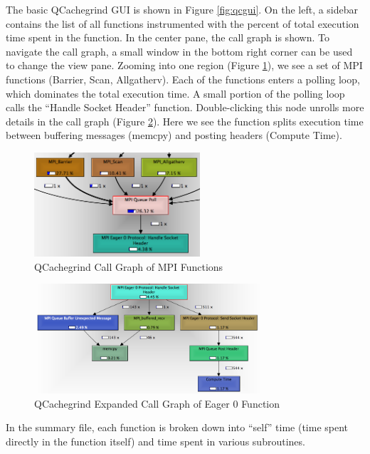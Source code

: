 The basic QCachegrind GUI is shown in Figure \ref{fig:qcgui}.  
On the left, a sidebar contains the list of all functions instrumented with the percent of total execution time spent in the function.
In the center pane, the call graph is shown.  
To navigate the call graph, a small window in the bottom right corner can be used to change the view pane.
Zooming into one region (Figure \ref{fig:qcgraphone}), we see a set of MPI functions (Barrier, Scan, Allgatherv).
Each of the functions enters a polling loop, which dominates the total execution time.  
A small portion of the polling loop calls the ``Handle Socket Header'' function.
Double-clicking this node unrolls more details in the call graph (Figure \ref{fig:qcgraphtwo}).
Here we see the function splits execution time between buffering messages (memcpy) and posting headers (Compute Time).

\begin{figure}[h!]
\centering
\includegraphics[width=0.55\textwidth]{figures/graphviz/callgraph1.png}
\caption{QCachegrind Call Graph of MPI Functions}
\label{fig:qcgraphone}
\end{figure}

\begin{figure}[h!]
\centering
\includegraphics[width=0.75\textwidth]{figures/graphviz/callgraph2.png}
\caption{QCachegrind Expanded Call Graph of Eager 0 Function}
\label{fig:qcgraphtwo}
\end{figure}

In the summary file, each function is broken down into ``self'' time (time spent directly in the function itself)
and time spent in various subroutines.

